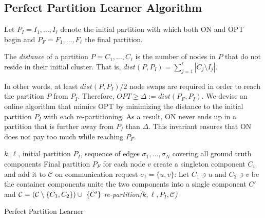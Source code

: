 \subsection{Perfect Partition Learner Algorithm}



Let $P_I = I_1, \dots, I_{\ell}$ denote the initial partition with which both ON and OPT begin and
$P_F = F_1, \dots, F_{\ell}$ the final partition.
\begin{definition}	\label{def:dist}
	The \emph{distance} of a partition $P = C_1, \dots, C_{\ell}$ is the number of nodes in $P$ that do not reside in their initial cluster.
	That is,
	$dist(P, P_I) = \sum_{j=1}^{\ell} | C_j \setminus I_j |$. 
\end{definition}

In other words,
at least $dist(P, P_I)/2$ node swaps are required in order to reach the partition $P$ from $P_I$.
Therefore,
$OPT \geq \Delta:= dist(P_F, P_I) $.
We devise an online algorithm that mimics OPT by minimizing the distance to the initial partition $P_I$ with each re-partitioning.
As a result,
ON never ends up in a partition that is further away from $P_I$ than $\Delta$.
This invariant ensures that ON does not pay too much while reaching $P_F$.

\begin{algorithm}
	\renewcommand{\algorithmicrequire}{\textbf{Input:}}
	\renewcommand{\algorithmicensure}{\textbf{Output:}}
	\begin{algorithmic}[1]
		\Require 
		$k, \ell$,
		initial partition $P_I$,
		sequence of  edges $\sigma_1, \dots, \sigma_N$ covering all ground truth components
		\Ensure Final partition $P_F$ 
		\State for each node $v$ create a singleton component $C_v$ and add it to $\mathcal{C}$ \label{line:initcomponents}
		\State on communication request $\sigma_t=\{u,v\}$:
		\State Let $C_1 \ni u$ and $C_2 \ni v$ be the container components
		\State unite the two components into a single component $C'$ and
		$\mathcal{C} = (\mathcal{C}\setminus\{C_1, C_2\}) \cup ~\{C'\}$ \label{line:mergecomponents}
		\State \textit{re-partition($k, \ell, P_I, \mathcal{C}$)} \label{line:rebalance} 
		\EndIf
		\EndIf
	\end{algorithmic}
	\caption{Perfect Partition Learner}
	\label{alg:ppl}
      \end{algorithm}


